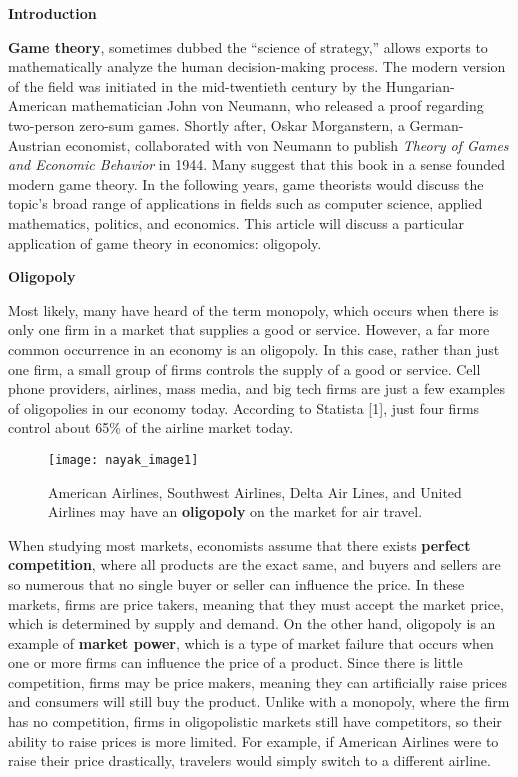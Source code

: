 
\noindent
\textbf{Introduction}

\textbf{Game theory}, sometimes dubbed the “science of strategy,” allows exports to mathematically analyze the human decision-making process. The modern version of the field was initiated in the mid-twentieth century by the Hungarian-American mathematician John von Neumann, who released a proof regarding two-person zero-sum games. Shortly after, Oskar Morganstern, a German-Austrian economist, collaborated with von Neumann to publish \emph{Theory of Games and Economic Behavior} in 1944. Many suggest that this book in a sense founded modern game theory. In the following years, game theorists would discuss the topic’s broad range of applications in fields such as computer science, applied mathematics, politics, and economics. This article will discuss a particular application of game theory in economics: oligopoly.

\noindent
\textbf{Oligopoly}

Most likely, many have heard of the term monopoly, which occurs when there is only one firm in a market that supplies a good or service. However, a far more common occurrence in an economy is an oligopoly. In this case, rather than just one firm, a small group of firms controls the supply of a good or service. Cell phone providers, airlines, mass media, and big tech firms are just a few examples of oligopolies in our economy today. According to Statista [1], just four firms control about 65\% of the airline market today.

\begin{figure}[htp]
    \centering
    \begin{minipage}{9cm}
    \texttt{[image: nayak\_image1]}
    \caption{American Airlines, Southwest Airlines, Delta Air Lines, and United Airlines may have an \textbf{oligopoly} on the market for air travel.}
    \label{fig:1}
    \end{minipage}
\end{figure}

	When studying most markets, economists assume that there exists \textbf{perfect competition}, where all products are the exact same, and buyers and sellers are so numerous that no single buyer or seller can influence the price. In these markets, firms are price takers, meaning that they must accept the market price, which is determined by supply and demand. On the other hand, oligopoly is an example of \textbf{market power}, which is a type of market failure that occurs when one or more firms can influence the price of a product. Since there is little competition, firms may be price makers, meaning they can artificially raise prices and consumers will still buy the product. Unlike with a monopoly, where the firm has no competition, firms in oligopolistic markets still have competitors, so their ability to raise prices is more limited. For example, if American Airlines were to raise their price drastically, travelers would simply switch to a different airline.

